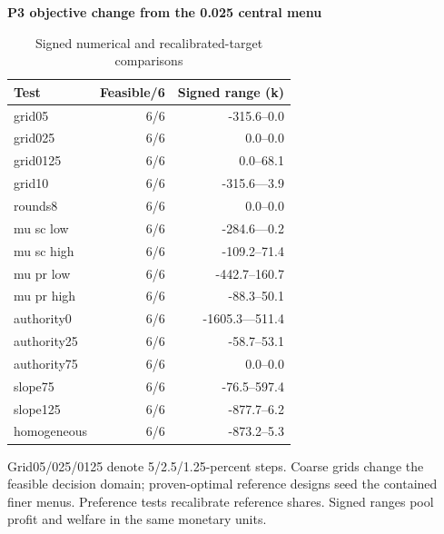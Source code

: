 \begin{table}[htbp]\centering
\caption{Signed numerical and recalibrated-target comparisons}\label{tab:review_numerics}
\begin{minipage}{.95\textwidth}\fontsize{8}{10}\selectfont{}\setlength{\tabcolsep}{2pt}\renewcommand{\arraystretch}{1.08}
\par\noindent\textbf{P3 objective change from the 0.025 central menu}\par\smallskip
\begin{tabular*}{\linewidth}{@{\extracolsep{\fill}}lrr@{}}\toprule
Test & Feasible/6 & Signed range (k) \\
\midrule
grid05 & 6/6 & -315.6--0.0 \\
grid025 & 6/6 & 0.0--0.0 \\
grid0125 & 6/6 & 0.0--68.1 \\
grid10 & 6/6 & -315.6---3.9 \\
rounds8 & 6/6 & 0.0--0.0 \\
mu sc low & 6/6 & -284.6---0.2 \\
mu sc high & 6/6 & -109.2--71.4 \\
mu pr low & 6/6 & -442.7--160.7 \\
mu pr high & 6/6 & -88.3--50.1 \\
authority0 & 6/6 & -1605.3---511.4 \\
authority25 & 6/6 & -58.7--53.1 \\
authority75 & 6/6 & 0.0--0.0 \\
slope75 & 6/6 & -76.5--597.4 \\
slope125 & 6/6 & -877.7--6.2 \\
homogeneous & 6/6 & -873.2--5.3 \\
\bottomrule\end{tabular*}\par\medskip
\par\noindent\fontsize{8}{9.5}\selectfont Grid05/025/0125 denote 5/2.5/1.25-percent steps. Coarse grids change the feasible decision domain; proven-optimal reference designs seed the contained finer menus. Preference tests recalibrate reference shares. Signed ranges pool profit and welfare in the same monetary units.
\end{minipage}\end{table}
